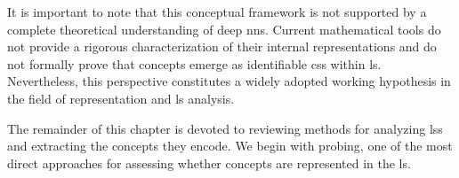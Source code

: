 It is important to note that this conceptual framework is not supported by a complete theoretical understanding of deep \glspl{nn}.
Current mathematical tools do not provide a rigorous characterization of their internal representations and do not formally prove that concepts emerge as identifiable \glspl{cs} within \gls{ls}.
Nevertheless, this perspective constitutes a widely adopted working hypothesis in the field of representation and \gls{ls} analysis.

The remainder of this chapter is devoted to reviewing methods for analyzing \glspl{ls} and extracting the concepts they encode.
We begin with probing, one of the most direct approaches for assessing whether concepts are represented in the \gls{ls}.